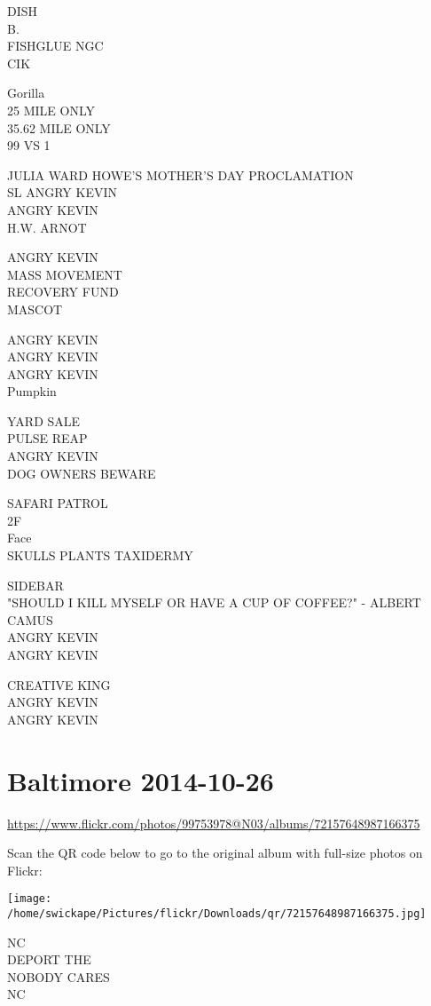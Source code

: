 \documentclass[10pt,letterpaper]{article}
\begin{document}
DISH\\
B.\\
FISHGLUE NGC\\
CIK

Gorilla\\
25 MILE ONLY\\
35.62 MILE ONLY\\
99 VS 1

JULIA WARD HOWE'S MOTHER'S DAY PROCLAMATION\\
SL ANGRY KEVIN\\
ANGRY KEVIN\\
H.W. ARNOT

ANGRY KEVIN\\
MASS MOVEMENT\\
RECOVERY FUND\\
MASCOT

ANGRY KEVIN\\
ANGRY KEVIN\\
ANGRY KEVIN\\
Pumpkin

YARD SALE\\
PULSE REAP\\
ANGRY KEVIN\\
DOG OWNERS BEWARE

SAFARI PATROL\\
2F\\
Face\\
SKULLS PLANTS TAXIDERMY

SIDEBAR\\
"SHOULD I KILL MYSELF OR HAVE A CUP OF COFFEE?" {-} ALBERT CAMUS\\
ANGRY KEVIN\\
ANGRY KEVIN

CREATIVE KING\\
ANGRY KEVIN\\
ANGRY KEVIN


\section*{Baltimore 2014-10-26}

\url{https://www.flickr.com/photos/99753978@N03/albums/72157648987166375}

Scan the QR code below to go to the original album with full-size photos on Flickr:

\texttt{[image: /home/swickape/Pictures/flickr/Downloads/qr/72157648987166375.jpg]}


NC\\
DEPORT THE\\
NOBODY CARES\\
NC
\end{document}
